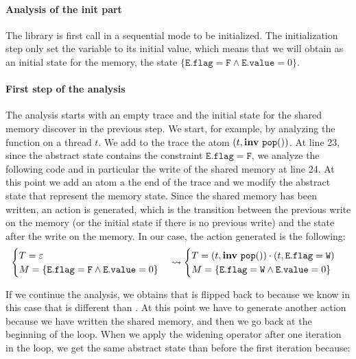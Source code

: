 \paragraph{Analysis of the init part} 

The library is first call in a sequential mode to be initialized. The initialization step only set the variable  to its initial value, which means that we will obtain as an initial state for the memory, the state $\{\mathtt{E.flag} = \mathtt{F} \wedge \mathtt{E.value} = 0\}$.


\paragraph{First step of the analysis}

The analysis starts with an empty trace and the initial state for the shared memory discover in the previous step. We start, for example, by analyzing the  function on a thread $t$. We add to the trace the atom $(t, \mathbf{inv}\ \mathtt{pop}())$. At line 23, since the abstract state contains the constraint $\mathtt{E.flag} = \mathtt{F}$, we analyze the following code and in particular the write of the shared memory at line 24. 
At this point we add an atom a the end of the trace and we modify the abstract state that represent the memory state. Since the shared memory has been written, an action is generated, which is the transition between the previous write on the memory (or the initial state if there is no previous write) and the state after the write on the memory. 
In our case, the action generated is the following:
\[\begin{cases}
	T = \varepsilon\\
	M = \{\mathtt{E.flag} = \mathtt{F} \wedge \mathtt{E.value} = 0\}
\end{cases} \leadsto
\begin{cases}
	T = (t, \mathbf{inv}\ \mathtt{pop}()) \cdot (t, \mathtt{E.flag} = \mathtt{W})\\
	M = \{\mathtt{E.flag} = \mathtt{W} \wedge \mathtt{E.value} = 0\}
\end{cases}\]

If we continue the analysis, we obtains that  is flipped back to  because we know in this case that  is different than . At this point we have to generate another action because we have written the shared memory, and then we go back at the beginning of the loop. 
When we apply the widening operator after one iteration in the loop, we get the same abstract state than before the first iteration because:


